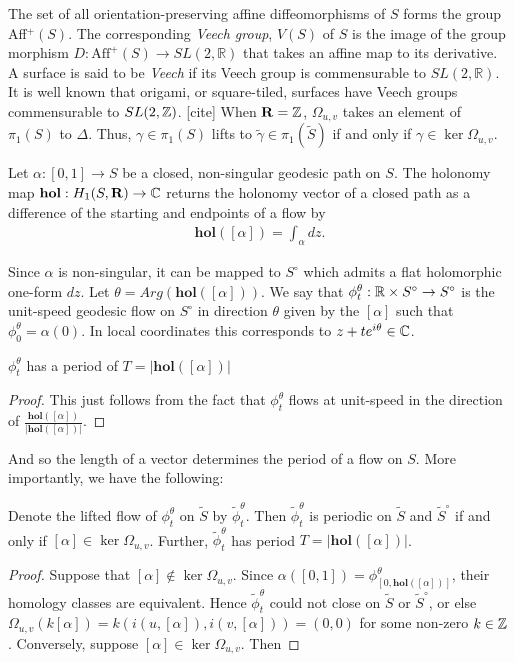 \documentclass[]{article}
\def\hol{\mathbf{hol}}
\begin{document}
The set of all orientation-preserving affine diffeomorphisms of $S$ forms the group Aff$^+(S)$. The corresponding \emph{Veech group}, $V(S)$ of $S$ is the image of the group morphism $D:\text{Aff}^+(S)\rightarrow SL(2,\mathbb{R})$ that takes an affine map to its derivative. A surface is said to be \emph{Veech} if its Veech group is commensurable to $SL(2,\mathbb{R})$. It is well known that origami, or square-tiled, surfaces have Veech groups commensurable to $SL(2,\mathbb{Z})$. [cite] When $\mathbf{R}=\mathbb{Z}$, $\Omega_{u,v}$ takes an element of $\pi_1(S)$ to $\Delta$. Thus, $\gamma\in\pi_1(S)$ lifts to $\tilde{\gamma}\in\pi_1(\tilde{S})$ if and only if $\gamma\in\ker\Omega_{u,v}$.

\begin{Def}
Let $\alpha:[0,1]\rightarrow S$ be a closed, non-singular geodesic path on $S$. The holonomy map $\mathbf{hol}:H_1(S, \mathbf{R})\rightarrow\mathbb{C}$ returns the holonomy vector of a closed path as a difference of the starting and endpoints of a flow by\\
\begin{align*}
\mathbf{hol}([\alpha])=\int_{\alpha}dz.
\end{align*}
\end{Def}
Since $\alpha$ is non-singular, it can be mapped to $S^\circ$ which admits a flat holomorphic one-form $dz$. Let $\theta=Arg(\mathbf{hol}([\alpha]))$. We say that $\phi_t^\theta:\mathbb{R}\times S^\circ \rightarrow S^\circ$ is the unit-speed geodesic flow on $S^\circ$ in direction $\theta$ given by the  $[\alpha]$ such that $\phi^\theta_0=\alpha(0)$. In local coordinates this corresponds to $z+te^{i\theta}\in \mathbb{C}$.

\begin{lem}
$\phi_t^\theta$ has a period of $T=|\mathbf{hol}([\alpha])|$
\begin{proof}
This just follows from the fact that $\phi_t^\theta$ flows at unit-speed in the direction of $\frac{\mathbf{hol}([\alpha])}{|\mathbf{hol}([\alpha])|}$. 
\end{proof}
\end{lem}
And so the length of a vector determines the period of a flow on $S$. More importantly, we have the following:

\begin{lem}
Denote the lifted flow of $\phi_t^\theta$ on $\tilde{S}$ by $\tilde{\phi}_t^\theta$. Then $\tilde{\phi}_t^\theta$ is periodic on $\tilde{S}$ and $\tilde{S}^\circ$ if and only if $[\alpha]\in\ker\Omega_{u,v}$. Further, $\tilde{\phi}_t^\theta$ has period $T=|\mathbf{hol}([\alpha])|$.
\begin{proof}
Suppose that $[\alpha]\notin\ker\Omega_{u,v}$. Since $\alpha([0,1])=\phi^\theta_{[0,\hol([\alpha])]}$, their homology classes are equivalent. Hence $\tilde{\phi}_t^\theta$ could not close on $\tilde{S}$ or $\tilde{S}^\circ$, or else $\Omega_{u,v}(k[\alpha])=k(i(u,[\alpha]),i(v,[\alpha]))=(0,0)$ for some non-zero $k\in\mathbb{Z}$. Conversely, suppose $[\alpha]\in\ker\Omega_{u,v}$. Then 
\end{proof}
\end{lem}
\end{document}
